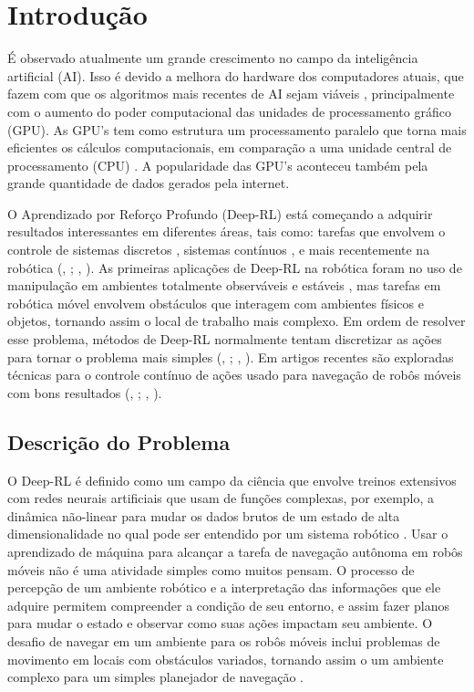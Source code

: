 \chapter{Introdução}

É observado atualmente um grande crescimento no campo da inteligência artificial (AI). 
Isso é devido a melhora do hardware dos computadores atuais, que fazem com que os algoritmos mais recentes de AI sejam viáveis \cite{luo2005artificial}, principalmente com o aumento do poder computacional das unidades de processamento gráfico (GPU). 
As GPU’s tem como estrutura um processamento paralelo que torna mais eficientes os cálculos computacionais, em comparação a uma unidade central de processamento (CPU) \cite{asano2009performance}. 
A popularidade das GPU’s aconteceu também pela grande quantidade de dados gerados pela internet.

O Aprendizado por Reforço Profundo (Deep-RL) está começando a adquirir resultados interessantes em diferentes áreas, tais como: tarefas que envolvem o controle de sistemas discretos \cite{mnih2013playing}, sistemas contínuos \cite{lillicrap2015continuous}, e mais recentemente na robótica (\citeauthor{gu2017deep}, \citeyear{gu2017deep}; \citeauthor{mahmood2018benchmarking}, \citeyear{mahmood2018benchmarking}).
As primeiras aplicações de Deep-RL na robótica foram no uso de manipulação em ambientes totalmente observáveis e estáveis \cite{gu2016continuous}, mas tarefas em robótica móvel envolvem obstáculos que interagem com ambientes físicos e objetos, tornando assim o local de trabalho mais complexo.
Em ordem de resolver esse problema, métodos de Deep-RL normalmente tentam discretizar as ações para tornar o problema mais simples (\citeauthor{tai2016towards}, \citeyear{tai2016towards}; \citeauthor{zhu2017target}, \citeyear{zhu2017target}).
Em artigos recentes são exploradas técnicas para o controle contínuo de ações usado para navegação de robôs móveis com bons resultados (\citeauthor{tai2017virtual}, \citeyear{tai2017virtual}; \citeauthor{chen2017socially}, \citeyear{chen2017socially}).

\section{Descrição do Problema}

O Deep-RL é definido como um campo da ciência que envolve treinos extensivos com redes neurais artificiais que usam de funções complexas, por exemplo, a dinâmica não-linear para mudar os dados brutos de um estado de alta dimensionalidade no qual pode ser entendido por um sistema robótico \cite{lecun2015deep}.
Usar o aprendizado de máquina para alcançar a tarefa de navegação autônoma em robôs móveis não é uma atividade simples como muitos pensam. 
O processo de percepção de um ambiente robótico e a interpretação das informações que ele adquire permitem compreender a condição de seu entorno, e assim fazer planos para mudar o estado e observar como suas ações impactam seu ambiente.
O desafio de navegar em um ambiente para os robôs móveis inclui problemas de movimento em locais com obstáculos variados, tornando assim o um ambiente complexo para um simples planejador de navegação \cite{shabbir2018survey}.

